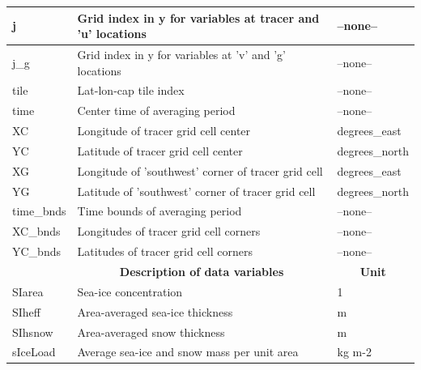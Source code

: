 \begin{longtable}{|m{}|m{}|m{}|}
j &Grid index in y for variables at tracer and 'u' locations &--none--  \\ \hline
j\_g &Grid index in y for variables at 'v' and 'g' locations &--none--  \\ \hline
tile &Lat-lon-cap tile index &--none--  \\ \hline
time &Center time of averaging period &--none--  \\ \hline
XC &Longitude of tracer grid cell center &degrees\_east  \\ \hline
YC &Latitude of tracer grid cell center &degrees\_north  \\ \hline
XG &Longitude of 'southwest' corner of tracer grid cell &degrees\_east  \\ \hline
YG &Latitude of 'southwest' corner of tracer grid cell &degrees\_north  \\ \hline
time\_bnds &Time bounds of averaging period &--none--  \\ \hline
XC\_bnds &Longitudes of tracer grid cell corners &--none--  \\ \hline
YC\_bnds &Latitudes of tracer grid cell corners &--none--  \\ \hline
\rowcolor{lightgray} \multicolumn{1}{|c|}{\textbf{Variables}} & \multicolumn{1}{|c|}{\textbf{Description of data variables}} &  \multicolumn{1}{|c|}{\textbf{Unit}}\\ \hline
SIarea &Sea-ice concentration &1  \\ \hline
SIheff &Area-averaged sea-ice thickness &m  \\ \hline
SIhsnow &Area-averaged snow thickness &m  \\ \hline
sIceLoad &Average sea-ice and snow mass per unit area &kg m-2  \\ \hline
\end{longtable}

\newp
\pagebreak
